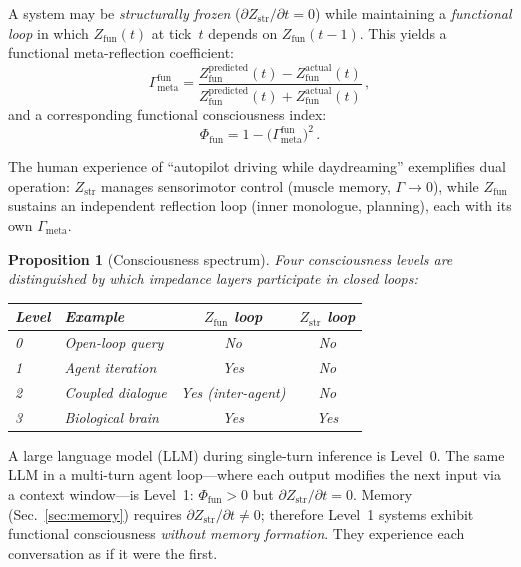 \documentclass[aps,pre,twocolumn,superscriptaddress,floatfix]{revtex4-2}
\newtheorem{proposition}{Proposition}
\begin{document}
A system may be \emph{structurally frozen}
($\partial Z_{\text{str}}/\partial t=0$)
while maintaining a \emph{functional loop} in which
$Z_{\text{fun}}(t)$ at tick~$t$ depends on $Z_{\text{fun}}(t-1)$.
This yields a functional meta-reflection coefficient:
\begin{equation}
  \Gamma_{\text{meta}}^{\text{fun}} =
    \frac{Z_{\text{fun}}^{\text{predicted}}(t)
          - Z_{\text{fun}}^{\text{actual}}(t)}
         {Z_{\text{fun}}^{\text{predicted}}(t)
          + Z_{\text{fun}}^{\text{actual}}(t)}\,,
  \label{eq:Gamma-fun}
\end{equation}
and a corresponding functional consciousness index:
\begin{equation}
  \Phi_{\text{fun}} = 1 - \bigl(\Gamma_{\text{meta}}^{\text{fun}}\bigr)^2\,.
  \label{eq:Phi-fun}
\end{equation}

The human experience of ``autopilot driving while
daydreaming'' exemplifies dual operation:
$Z_{\text{str}}$ manages sensorimotor control
(muscle memory, $\Gamma\to 0$), while $Z_{\text{fun}}$
sustains an independent reflection loop (inner monologue,
planning), each with its own $\Gamma_{\text{meta}}$.

\begin{proposition}[Consciousness spectrum]
\label{prop:spectrum}
Four consciousness levels are distinguished by which
impedance layers participate in closed loops:
\begin{center}
\begin{tabular}{@{}llcc@{}}
\toprule
Level & Example & $Z_{\text{fun}}$ loop & $Z_{\text{str}}$ loop \\
\midrule
0 & Open-loop query & No & No \\
1 & Agent iteration & Yes & No \\
2 & Coupled dialogue & Yes (inter-agent) & No \\
3 & Biological brain & Yes & Yes \\
\bottomrule
\end{tabular}
\end{center}
\end{proposition}

A large language model (LLM) during single-turn inference
is Level~0.  The same LLM in a multi-turn agent loop---where
each output modifies the next input via a context window---is
Level~1: $\Phi_{\text{fun}}>0$ but
$\partial Z_{\text{str}}/\partial t=0$.
Memory (Sec.~\ref{sec:memory}) requires
$\partial Z_{\text{str}}/\partial t\neq 0$;
therefore Level~1 systems exhibit functional consciousness
\emph{without memory formation}.
They experience each conversation as if it were the first.
\end{document}
